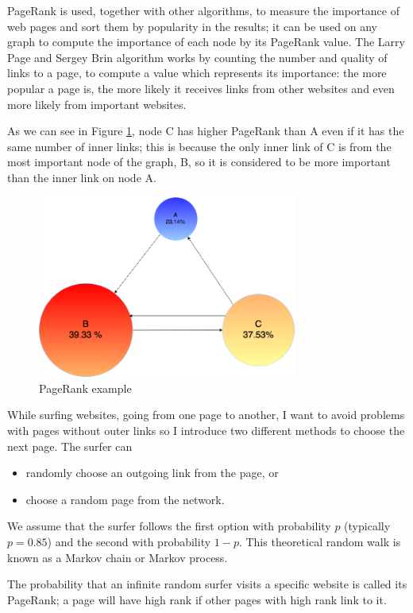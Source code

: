 \documentclass[]{usiinfbachelorproject}
\begin{document}
PageRank is used, together with other algorithms, to measure the importance of web pages and sort them by popularity in the results; it can be used on any graph to compute the importance of each node by its PageRank value. The Larry Page and  Sergey Brin algorithm works by counting the number and quality of links to a page, to compute a value which represents its importance: the more popular a page is, the more likely it receives links from other websites and even more likely from important websites.


As we can see in Figure \ref{fig:prexample}, node C has higher PageRank than A even if it has the same number of inner links; this is because the only inner link of C is from the most important node of the graph, B, so it is considered to be more important than the inner link on node A.

\begin{figure}[tb]
	\centering
	\includegraphics[height=6cm]{img/page_rank_example.png}
	\caption{PageRank example}
	\label{fig:prexample}
\end{figure}

While surfing websites, going from one page to another, I want to avoid problems with pages without outer links so I introduce two different methods to choose the next page. The surfer can
\begin{itemize}
\item randomly choose an outgoing link from the page, or
\item choose a random page from the network.
\end{itemize}
We assume that the surfer follows the first option with probability $p$ (typically $p=0.85$) and the second with probability $1-p$. This theoretical random walk is known as a Markov chain or Markov process.

The probability that an infinite random surfer visits a specific website is called its PageRank; a page will have high rank if other pages with high rank link to it.
\end{document}
